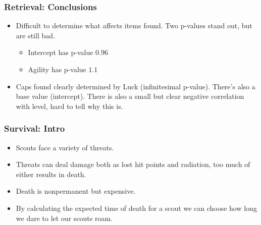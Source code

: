 \documentclass{beamer}
\begin{document}
\begin{frame}
  \frametitle{Retrieval: Conclusions}
  \begin{itemize}
  \item Difficult to determine what affects items found. Two p-values stand out, but are still bad.
    \begin{itemize}
    \item Intercept has p-value $0.96$
    \item Agility has p-value $1.1$
    \end{itemize}
  \item Caps found clearly determined by Luck (infinitesimal p-value). There's also a base value (intercept). There is also a small but clear negative correlation with level, hard to tell why this is.
  \end{itemize}
\end{frame}


\begin{frame}
  \frametitle{Survival: Intro}
  \begin{itemize}
  \item Scouts face a variety of threats.
  \item Threats can deal damage both as lost hit points and radiation, too much of either results in death.
  \item Death is nonpermanent but expensive.
  \item By calculating the expected time of death for a scout we can choose how long we dare to let our scouts roam.
  \end{itemize}
\end{frame}
\end{document}
